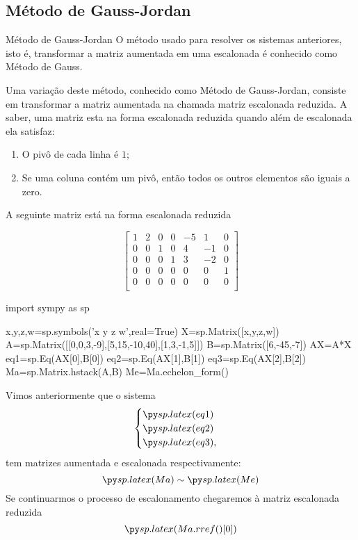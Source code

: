 \subsection*{Método de Gauss-Jordan}

\begin{frame}{Método de Gauss-Jordan}
O método usado para resolver os sistemas anteriores, isto é, transformar a matriz aumentada em uma escalonada é conhecido como {\color{blue} Método de Gauss}.
\medskip

Uma variação deste método, conhecido como {\color{blue} Método de Gauss-Jordan}, consiste em transformar a matriz aumentada na chamada {\color{blue} matriz escalonada reduzida}. A saber, uma matriz esta na forma {\color{blue}escalonada reduzida} quando além de escalonada ela satisfaz:
\begin{block}{ }
\begin{enumerate}[a]
\item O pivô de cada linha é $1$;
\item Se uma coluna contém um pivô, então todos os outros elementos são iguais a zero.
\end{enumerate}
\end{block}
\end{frame}

\begin{frame}[label=sistemas]
A seguinte matriz está na forma escalonada reduzida

\[
\begin{bmatrix}
1& 2 & 0 & 0& -5 & 1 & 0 \\
0& 0 & 1 & 0 & 4 & -1 & 0\\
0& 0& 0& 1 & 3& -2& 0\\
0& 0& 0& 0 & 0& 0& 1\\
0& 0& 0& 0 & 0& 0& 0\\
\end{bmatrix}
\]
\end{frame}

\begin{frame}[label=sistemas,fragile=singleslide]{}

\begin{pycode}
import sympy as sp

x,y,z,w=sp.symbols('x y z w',real=True)
X=sp.Matrix([x,y,z,w])
A=sp.Matrix([[0,0,3,-9],[5,15,-10,40],[1,3,-1,5]])
B=sp.Matrix([6,-45,-7])
AX=A*X
eq1=sp.Eq(AX[0],B[0])
eq2=sp.Eq(AX[1],B[1])
eq3=sp.Eq(AX[2],B[2])
Ma=sp.Matrix.hstack(A,B)
Me=Ma.echelon_form()
\end{pycode}

Vimos anteriormente que o sistema
\[\begin{cases}
\pyl{eq1}\\
\pyl{eq2}\\
\pyl{eq3},
\end{cases}\]
tem matrizes aumentada e escalonada respectivamente:
\[\pyl{Ma} \sim \pyl{Me}\]
Se continuarmos o processo de escalonamento chegaremos à matriz escalonada reduzida
\[\pyl{Ma.rref()[0]}\]
\end{frame}


